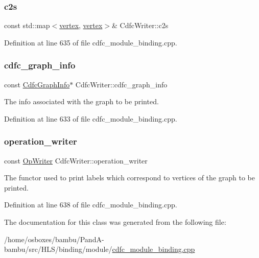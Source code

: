 \subsubsection{\texorpdfstring{c2s}{c2s}}
{\footnotesize\ttfamily const std\+::map$<$\hyperlink{graph_8hpp_abefdcf0544e601805af44eca032cca14}{vertex}, \hyperlink{graph_8hpp_abefdcf0544e601805af44eca032cca14}{vertex}$>$\& Cdfc\+Writer\+::c2s\hspace{0.3cm}{\ttfamily [private]}}



Definition at line 635 of file cdfc\+\_\+module\+\_\+binding.\+cpp.

\mbox{\label{classCdfcWriter_a74b6b6e42d3dfe1ef189d0448bcbd19a}} 
\subsubsection{\texorpdfstring{cdfc\+\_\+graph\+\_\+info}{cdfc\_graph\_info}}
{\footnotesize\ttfamily const \hyperlink{structCdfcGraphInfo}{Cdfc\+Graph\+Info}$\ast$ Cdfc\+Writer\+::cdfc\+\_\+graph\+\_\+info\hspace{0.3cm}{\ttfamily [private]}}



The info associated with the graph to be printed. 



Definition at line 633 of file cdfc\+\_\+module\+\_\+binding.\+cpp.

\mbox{\label{classCdfcWriter_a8c0428c02685009db8d288bed18328ec}} 
\subsubsection{\texorpdfstring{operation\+\_\+writer}{operation\_writer}}
{\footnotesize\ttfamily const \hyperlink{classOpWriter}{Op\+Writer} Cdfc\+Writer\+::operation\+\_\+writer\hspace{0.3cm}{\ttfamily [private]}}



The functor used to print labels which correspond to vertices of the graph to be printed. 



Definition at line 638 of file cdfc\+\_\+module\+\_\+binding.\+cpp.



The documentation for this class was generated from the following file\+:\begin{DoxyCompactItemize}
\item 
/home/osboxes/bambu/\+Pand\+A-\/bambu/src/\+H\+L\+S/binding/module/\hyperlink{cdfc__module__binding_8cpp}{cdfc\+\_\+module\+\_\+binding.\+cpp}\end{DoxyCompactItemize}
